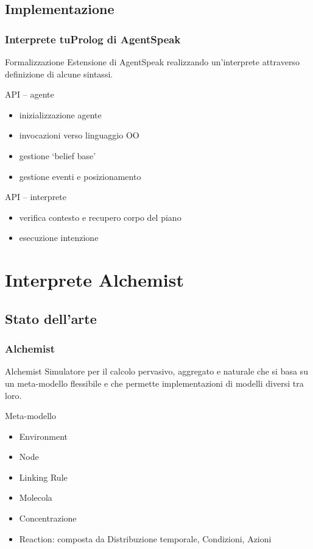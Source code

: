 \documentclass[handout]{beamer}\mode<presentation>{\usetheme{AMSCesenaBleu}}
\begin{document}
\subsection{Implementazione}
\begin{frame}
\frametitle{Interprete tuProlog di AgentSpeak}
\begin{block}{Formalizzazione}
Estensione di AgentSpeak realizzando un'interprete attraverso definizione di alcune sintassi.
\end{block}

\begin{block}{API -- agente}
\begin{itemize}
\item inizializzazione agente
\item invocazioni verso linguaggio OO
\item gestione `belief base'
\item gestione eventi e posizionamento
\end{itemize}
\end{block}

\begin{block}{API -- interprete}
\begin{itemize}
\item verifica contesto e recupero corpo del piano
\item esecuzione intenzione
\end{itemize}
\end{block}
\end{frame}



\section{Interprete Alchemist}

\subsection{Stato dell'arte}
\begin{frame}
\frametitle{Alchemist}
\begin{block}{Alchemist}
Simulatore per il calcolo pervasivo, aggregato e naturale che si basa su un meta-modello flessibile e che permette implementazioni di modelli diversi tra loro.
\end{block}
\begin{block}{Meta-modello}
\begin{itemize}
\item Environment
\item Node
\item Linking Rule
\item Molecola
\item Concentrazione
\item Reaction: composta da Distribuzione temporale, Condizioni, Azioni
\end{itemize}
\end{block}
\end{frame}
\end{document}

